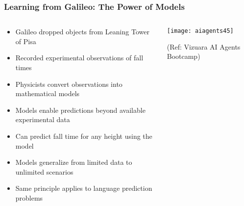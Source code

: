 \begin{frame}[fragile]\frametitle{Learning from Galileo: The Power of Models}

\begin{columns}
    \begin{column}[T]{0.6\linewidth}
      \begin{itemize}
	  \item Galileo dropped objects from Leaning Tower of Pisa
	  \item Recorded experimental observations of fall times
	  \item Physicists convert observations into mathematical models
	  \item Models enable predictions beyond available experimental data
	  \item Can predict fall time for any height using the model
	  \item Models generalize from limited data to unlimited scenarios
	  \item Same principle applies to language prediction problems
	  \end{itemize}

    \end{column}
    \begin{column}[T]{0.4\linewidth}
		\begin{center}
		\texttt{[image: aiagents45]}

		{\tiny (Ref: Vizuara AI Agents Bootcamp)}

		\end{center}	
    \end{column}
  \end{columns}
  
 
\end{frame}

